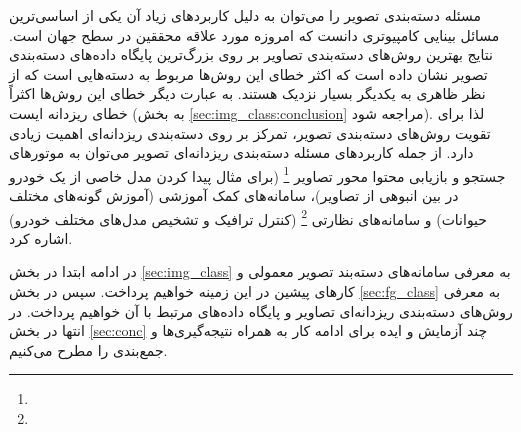 \documentclass[11pt]{article}
\begin{document}
مسئله دسته‌بندی تصویر را می‌توان به دلیل کاربردهای زیاد آن یکی از اساسی‌ترین مسائل بینایی کامپیوتری دانست که امروزه مورد علاقه محققین در سطح جهان است. نتایج بهترین روش‌های دسته‌بندی تصاویر بر روی بزرگ‌ترین پایگاه داده‌های دسته‌بندی تصویر نشان داده است که اکثر خطای این روش‌ها مربوط به دسته‌هایی است که از نظر ظاهری به یکدیگر بسیار نزدیک هستند. به عبارت دیگر خطای این روش‌ها اکثراً خطای ریزدانه ایست (به بخش
\ref{sec:img_class:conclusion}
مراجعه شود). لذا برای تقویت روش‌های دسته‌بندی تصویر، تمرکز بر روی دسته‌بندی ریزدانه‌ای اهمیت زیادی دارد.
از جمله کاربردهای مسئله دسته‌بندی ریزدانه‌ای تصویر می‌توان به موتورهای جستجو و بازیابی محتوا محور تصاویر
\footnote{}
(برای مثال پیدا کردن مدل خاصی از یک خودرو در بین انبوهی از تصاویر)، سامانه‌های کمک آموزشی (آموزش گونه‌های مختلف حیوانات) و سامانه‌های نظارتی
\footnote{}
(کنترل ترافیک و تشخیص مدل‌های مختلف خودرو) اشاره کرد.

در ادامه ابتدا در بخش
\ref{sec:img_class}
به معرفی سامانه‌های دسته‌بند تصویر معمولی و کارهای پیشین در این زمینه خواهیم پرداخت. سپس در بخش
\ref{sec:fg_class}
به معرفی روش‌های دسته‌بندی ریزدانه‌ای تصاویر و پایگاه داده‌های مرتبط با آن خواهیم پرداخت. در انتها در بخش
\ref{sec:conc}
چند آزمایش و ایده برای ادامه کار به همراه نتیجه‌گیری‌ها و جمع‌بندی را مطرح می‌کنیم.

\end{document}
